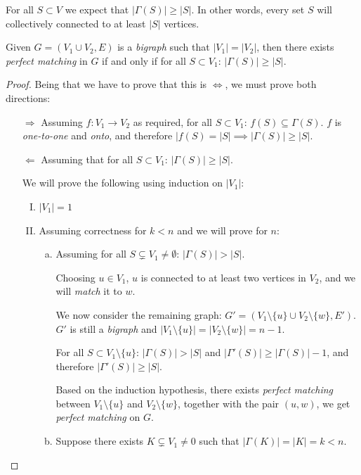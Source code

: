 \documentclass[00_complete]{subfiles}
\begin{document}
    For all $S \subset V$ we expect that $|\Gamma(S)|\geq|S|$. In other words,
    every set $S$ will collectively connected to at least $|S|$ vertices.
\begin{theorem}
    Given $G=(V_1\cup V_2,E)$ is a \emph{bigraph} such that $|V_1|=|V_2|$, then
    there exists \emph{perfect matching} in $G$ if and only if for all $S \subset
    V_1$: $|\Gamma(S)|\geq|S|$.
\end{theorem}
\begin{proof}
    Being that we have to prove that this is $\iff$, we must prove both directions:
    \begin{enumerate}
        \item[$\Rightarrow$] Assuming $f:V_1 \to V_2$ as required, for all $S
            \subset V_1$: $f(S) \subseteq \Gamma(S)$. $f$ is \emph{one-to-one}
            and \emph{onto}, and therefore $|f(S)=|S| \implies
            |\Gamma(S)|\geq|S|$.
        \item[$\Leftarrow$] Assuming that for all $S \subset V_1$: $|\Gamma(S)|
            \geq |S|$.

            We will prove the following using induction on $|V_1|$:
            \begin{enumerate}[I.]
                \item $|V_1|=1$
                \item Assuming correctness for $k<n$ and we will prove for $n$:
                    \begin{enumerate}[a.]
                        \item Assuming for all $S \subsetneq V_1 \neq \emptyset$:
                        $|\Gamma(S)|>|S|$.

                        Choosing $u \in V_1$, $u$ is connected to at least two
                        vertices in $V_2$, and we will \emph{match} it to $w$.

                        We now consider the remaining graph:
                        $G'=(V_1\setminus\{u\}\cup V_2\setminus\{w\},E')$.
                        $G'$ is still a \emph{bigraph} and $|V_1\setminus\{u\}|
                        = |V_2\setminus\{w\}|=n-1$.

                        For all $S \subset V_1\setminus\{u\}$:
                        $|\Gamma(S)|>|S|$ and $|\Gamma'(S)|\geq|\Gamma(S)|-1$,
                        and therefore $|\Gamma'(S)|\geq|S|$.

                        Based on the induction hypothesis, there exists
                        \emph{perfect matching} between $V_1\setminus\{u\}$ and
                        $V_2\setminus\{w\}$, together with the pair $(u,w)$, we
                        get \emph{perfect matching} on $G$.
                        \item Suppose there exists $K \subsetneq V_1 \neq 0$
                        such that $|\Gamma(K)|=|K|=k < n$.


\end{enumerate}
\end{enumerate}
\end{enumerate}
\end{proof}
\end{document}
